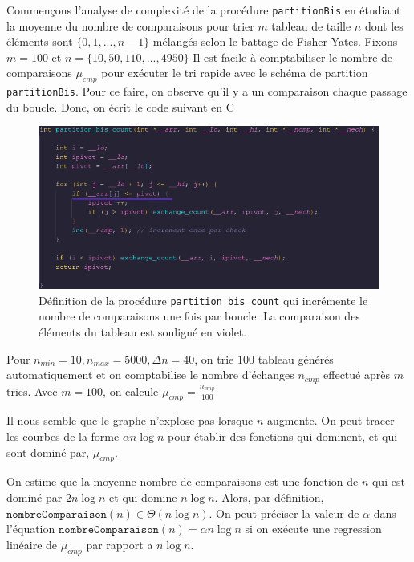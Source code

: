 \documentclass[10pt]{article} %
\begin{document}
Commen\c cons l'analyse de complexité de la procédure \texttt{partitionBis} en étudiant la moyenne du nombre de comparaisons
pour trier $m$ tableau de taille $n$ dont les éléments sont $\{ 0, 1, ..., n - 1\}$ mélangés selon le battage de Fisher-Yates.
Fixons $m = 100$ et $n = \{10, 50, 110, ..., 4950\}$ Il est facile à comptabiliser le nombre de comparaisons $\mu_{cmp}$ pour exécuter le tri rapide avec
le schéma de partition \texttt{partitionBis}. Pour ce faire, on observe qu'il y a un comparaison chaque passage du boucle. Donc,
on écrit le code suivant en C

\begin{figure}[h!]
    \centering
    \includegraphics[width=.7\linewidth]{./media/partition_bis_count.png}
    \caption{Définition de la procédure \texttt{partition\_bis\_count} qui incrémente le nombre de comparaisons
    une fois par boucle. La comparaison des éléments du tableau est souligné en violet.}
\end{figure}

Pour $n_{min} = 10, n_{max} = 5000, \Delta n = 40$, on trie $100$ tableau générés automatiquement et on comptabilise le nombre
d'échanges $n_{cmp}$ effectué après $m$ tries. Avec $m = 100$, on calcule $\mu_{cmp} = \frac{n_{cmp}}{100}$

\newpage

\begin{figure}[h!]
    \centering
    

\end{figure}

Il nous semble que le graphe n'explose pas lorsque $n$ augmente. On peut tracer les courbes de la forme $\alpha n\log n$ pour établir des
fonctions qui dominent, et qui sont dominé par, $\mu_{cmp}$.

\begin{figure}[h!]
    \centering
    
\end{figure}

On estime que la moyenne nombre de comparaisons est une fonction de $n$ qui est dominé par $2n \log n$ et qui domine
$n \log n$. Alors, par définition, $\texttt{nombreComparaison}(n) \in \Theta(n \log n)$. On peut préciser la valeur de
$\alpha$ dans l'équation $\texttt{nombreComparaison}(n) = \alpha n \log n$ si on exécute une regression linéaire de $\mu_{cmp}$
par rapport a $n \log n$.
\end{document}
